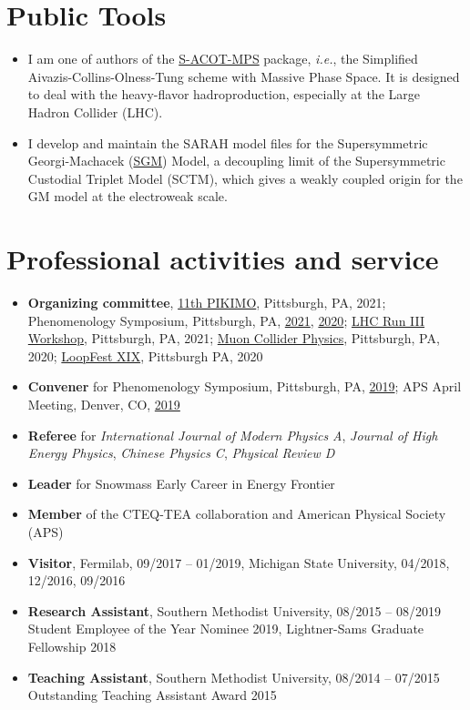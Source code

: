 \documentclass[12pt]{article}
\begin{document}
\section*{Public Tools}
\begin{itemize}
	\item I am one of authors of the \href{https://sacotmps.hepforge.org}{S-ACOT-MPS} package, \emph{i.e.}, the Simplified Aivazis-Collins-Olness-Tung scheme with Massive Phase Space.
	It is designed to deal with the heavy-flavor hadroproduction, especially at the Large Hadron Collider (LHC).
	\item I develop and maintain the SARAH model files for the Supersymmetric Georgi-Machacek (\href{https://sarah.hepforge.org/trac/wiki/CustodialTMSSM}{SGM}) Model, a decoupling limit of the Supersymmetric Custodial Triplet Model (SCTM), which gives a weakly coupled origin for the GM model at the electroweak scale.
\end{itemize}

\section*{Professional activities and service}
\begin{itemize}
\item \textbf{Organizing committee}, \href{https://indico.cern.ch/event/1091676/}{11th PIKIMO}, Pittsburgh, PA, 2021;  Phenomenology Symposium,  Pittsburgh, PA, \href{https://indico.cern.ch/event/982783/}{2021}, \href{https://indico.cern.ch/event/858682/}{2020}; \href{https://indico.cern.ch/event/1007936/}{LHC Run III Workshop}, Pittsburgh, PA, 2021;
\href{https://indico.cern.ch/event/969815/}{Muon Collider Physics}, Pittsburgh, PA, 2020; \href{https://indico.cern.ch/event/866125/}{LoopFest XIX}, Pittsburgh PA, 2020
\item \textbf{Convener} for Phenomenology Symposium, Pittsburgh, PA, \href{https://indico.cern.ch/event/777988/sessions/295207/#20190506}{2019}; APS April Meeting, Denver, CO, \href{https://meetings.aps.org/Meeting/APR19/Session/Z08}{2019}
\item \textbf{Referee} for \emph{International Journal of Modern Physics A}, \emph{Journal of High Energy Physics}, \emph{Chinese Physics C}, \emph{Physical Review D}
\item \textbf{Leader} for Snowmass Early Career in Energy Frontier
\item \textbf{Member} of the CTEQ-TEA collaboration and American Physical Society (APS)
\item \textbf{Visitor}, Fermilab, 09/2017 -- 01/2019, Michigan State University, 04/2018, 12/2016, 09/2016
\item \textbf{Research Assistant}, Southern Methodist University, 08/2015 -- 08/2019\\
Student Employee of the Year Nominee 2019, Lightner-Sams Graduate Fellowship 2018
\item 
\textbf{Teaching Assistant}, Southern Methodist University, 08/2014 -- 07/2015\\
Outstanding Teaching Assistant Award 2015
\end{itemize}
\end{document}
